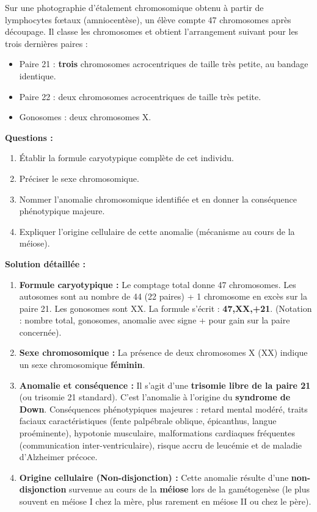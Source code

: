 \documentclass[11pt]{article}
\begin{document}
\begin{exoresolu}
Sur une photographie d'étalement chromosomique obtenu à partir de lymphocytes fœtaux (amniocentèse), un élève compte 47 chromosomes après découpage. Il classe les chromosomes et obtient l'arrangement suivant pour les trois dernières paires :
\begin{itemize}
    \item Paire 21 : \textbf{trois} chromosomes acrocentriques de taille très petite, au bandage identique.
    \item Paire 22 : deux chromosomes acrocentriques de taille très petite.
    \item Gonosomes : deux chromosomes X.
\end{itemize}
\textbf{Questions :}
\begin{enumerate}
    \item Établir la formule caryotypique complète de cet individu.
    \item Préciser le sexe chromosomique.
    \item Nommer l'anomalie chromosomique identifiée et en donner la conséquence phénotypique majeure.
    \item Expliquer l'origine cellulaire de cette anomalie (mécanisme au cours de la méiose).
\end{enumerate}
\tcblower
\textbf{Solution détaillée :}
\begin{enumerate}
    \item \textbf{Formule caryotypique :} Le comptage total donne 47 chromosomes. Les autosomes sont au nombre de 44 (22 paires) + 1 chromosome en excès sur la paire 21. Les gonosomes sont XX. La formule s'écrit : \textbf{47,XX,+21}. (Notation : nombre total, gonosomes, anomalie avec signe + pour gain sur la paire concernée).
    \item \textbf{Sexe chromosomique :} La présence de deux chromosomes X (XX) indique un sexe chromosomique \textbf{féminin}.
    \item \textbf{Anomalie et conséquence :} Il s'agit d'une \textbf{trisomie libre de la paire 21} (ou trisomie 21 standard). C'est l'anomalie à l'origine du \textbf{syndrome de Down}. Conséquences phénotypiques majeures : retard mental modéré, traits faciaux caractéristiques (fente palpébrale oblique, épicanthus, langue proéminente), hypotonie musculaire, malformations cardiaques fréquentes (communication inter-ventriculaire), risque accru de leucémie et de maladie d'Alzheimer précoce.
    \item \textbf{Origine cellulaire (Non-disjonction) :} Cette anomalie résulte d'une \textbf{non-disjonction} survenue au cours de la \textbf{méiose} lors de la gamétogenèse (le plus souvent en méiose I chez la mère, plus rarement en méiose II ou chez le père). 

\end{enumerate}
\end{exoresolu}
\end{document}
